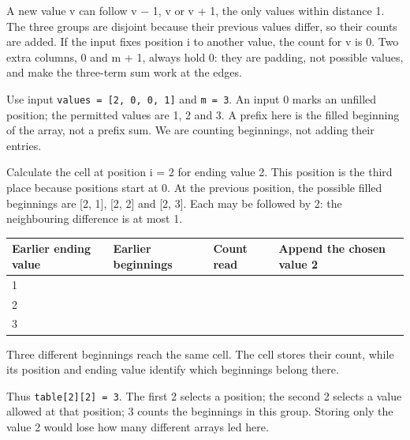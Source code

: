 \documentclass[11pt,a4paper,oneside]{report}
\newcommand{\picturecaption}[1]{\par{\small\color{quiet}#1}\par\medskip}
\begin{document}
A new value v can follow v − 1, v or v + 1, the only values within distance 1. The three groups are disjoint because their previous values differ, so their counts are added. If the input fixes position i to another value, the count for v is 0. Two extra columns, 0 and m + 1, always hold 0: they are padding, not possible values, and make the three-term sum work at the edges.

Use input \texttt{values = [2, 0, 0, 1]} and \texttt{m = 3}. An input 0 marks an unfilled position; the permitted values are 1, 2 and 3. A prefix here is the filled beginning of the array, not a prefix sum. We are counting beginnings, not adding their entries.

Calculate the cell at position i = 2 for ending value 2. This position is the third place because positions start at 0. At the previous position, the possible filled beginnings are [2, 1], [2, 2] and [2, 3]. Each may be followed by 2: the neighbouring difference is at most 1.

\par\medskip\begingroup\small\setlength{\tabcolsep}{4pt}\renewcommand{\arraystretch}{1.3}\begin{tabularx}{\linewidth}{>{\raggedright\arraybackslash}X>{\raggedright\arraybackslash}X>{\raggedright\arraybackslash}X>{\raggedright\arraybackslash}X}\toprule\textbf{Earlier ending value} & \textbf{Earlier beginnings} & \textbf{Count read} & \textbf{Append the chosen value 2}\\\midrule
{}1 & [2, 1] & 1 & [2, 1, 2]\\
{}2 & [2, 2] & 1 & [2, 2, 2]\\
{}3 & [2, 3] & 1 & [2, 3, 2]\\
\bottomrule\end{tabularx}\endgroup\par\medskip
{}\begin{center}\end{center}\picturecaption{Three different beginnings reach the same cell. The cell stores their count, while its position and ending value identify which beginnings belong there.}
Thus \texttt{table[2][2] = 3}. The first 2 selects a position; the second 2 selects a value allowed at that position; 3 counts the beginnings in this group. Storing only the value 2 would lose how many different arrays led here.
\end{document}
